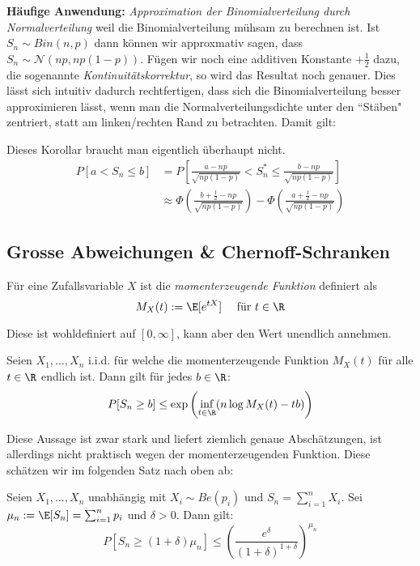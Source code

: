 \textbf{Häufige Anwendung:} \textit{Approximation der Binomialverteilung durch Normalverteilung} weil die Binomialverteilung mühsam zu berechnen ist. Ist $S_n \sim Bin(n,p)$ dann können wir approxmativ sagen, dass $S_n \sim \mathcal{N}(np, np(1-p))$. Fügen wir noch eine additiven Konstante $+\frac{1}{2}$ dazu, die sogenannte \textit{Kontinuitätskorrektur}, so wird das Resultat noch genauer. Dies lässt sich intuitiv dadurch rechtfertigen, dass sich die Binomialverteilung besser approximieren lässt, wenn man die Normalverteilungsdichte unter den ``Stäben" zentriert, statt am linken/rechten Rand zu betrachten. Damit gilt:\\
\begin{korollar}
Dieses Korollar braucht man eigentlich überhaupt nicht.
\begin{align*}
	P[a <  S_n \leq b] &= P \left[ \frac{a-np}{\sqrt{np(1-p)}} < S_n^* \leq \frac{b-np}{\sqrt{np(1-p)}} \right]\\&\approx \Phi \left(\frac{b+\frac{1}{2}-np}{\sqrt{np(1-p)}}\right) - \Phi \left( \frac{a+\frac{1}{2}-np}{\sqrt{np(1-p)}} \right)
\end{align*}
\end{korollar}

\subsection{Grosse Abweichungen \& Chernoff-Schranken}
\begin{definition}
Für eine Zufallsvariable $X$ ist die \textit{momenterzeugende Funktion} definiert als
$$ M_X(t) := \E[e^{tX}] \quad \mbox{ für } t\in \R$$
\end{definition}
Diese ist wohldefiniert auf $[0,\infty]$, kann aber den Wert unendlich annehmen.
\begin{satz}
Seien $X_1,\dots,X_n$ i.i.d. für welche die momenterzeugende Funktion $M_X(t)$ für alle $t\in\R$ endlich ist. Dann gilt für jedes $b\in\R$:
$$ P[S_n \geq b] \leq \exp\left( \inf_{t\in\R} (n\log M_X(t) - tb) \right)$$
\end{satz}
Diese Aussage ist zwar stark und liefert ziemlich genaue Abschätzungen, ist allerdings nicht praktisch wegen der momenterzeugenden Funktion. Diese schätzen wir im folgenden Satz nach oben ab:

\begin{satz}
Seien $X_1,\dots,X_n$ unabhängig mit $X_i \sim Be(p_i)$ und $S_n = \sum_{i=1}^n X_i$. Sei $\mu_n := \E[S_n] = \sum_{i=1}^n p_i$ und $\delta > 0$. Dann gilt:
$$
	P[S_n \geq (1+\delta) \mu_n] \leq
	\left(
		\frac{e^\delta}{(1+\delta)^{1+\delta}}
	\right)
	^{\mu_n}
$$
\end{satz}










